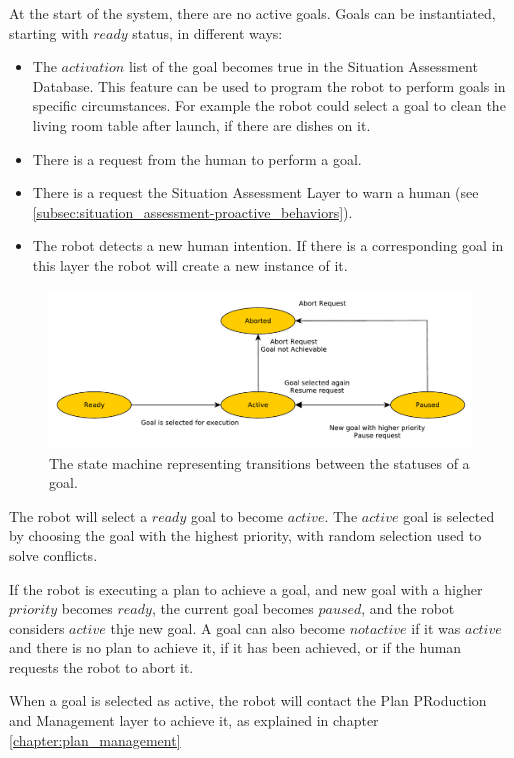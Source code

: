 At the start of the system, there are no active goals. Goals can be instantiated, starting with $ready$ status, in different ways:
\begin{itemize}
\item The $activation$ list of the goal becomes true in the Situation Assessment Database. This feature can be used to program the robot to perform goals in specific circumstances. For example the robot could select a goal to clean the living room table after launch, if there are dishes on it.
\item There is a request from the human to perform a goal. 
\item There is a request the Situation Assessment Layer to warn a human (see \ref{subsec:situation_assessment-proactive_behaviors}).
\item The robot detects a new human intention. If there is a corresponding goal in this layer the robot will create a new instance of it. 
\end{itemize}


\begin{figure}[h!]
	\centering
	\includegraphics[clip,scale=0.6]{img/goal_management/goal_cycle.pdf}
	\caption{The state machine representing transitions between the statuses of a goal.}
	\label{fig:goal_management-goal_cycle}
\end{figure}



The robot will select a $ready$ goal to become $active$. The $active$ goal is selected by choosing the goal with the highest priority, with random selection used to solve conflicts.

If the robot is executing a plan to achieve a goal, and new goal with a higher $priority$ becomes $ready$, the current goal becomes $paused$, and the robot considers $active$ thje new goal. A goal can also become $not active$ if it was $active$ and there is no plan to achieve it, if it has been achieved, or if the human requests the robot to abort it.

When a goal is selected as active, the robot will contact the Plan PRoduction and Management layer to achieve it, as explained in chapter \ref{chapter:plan_management}



